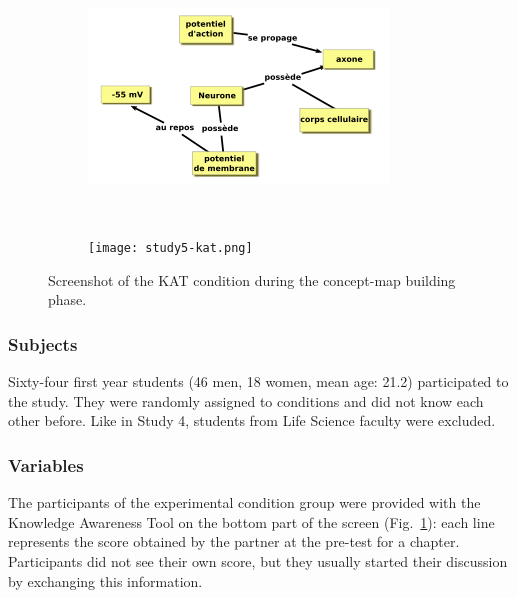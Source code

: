\documentclass[natbib]{svjour3}
\begin{document}
\begin{figure}[h!t]
        \centering
        \begin{subfigure}{.6\textwidth}
            \includegraphics[width=\linewidth]{study5-conceptmap.png}
        \end{subfigure} \\
        \begin{subfigure}{.7\textwidth}
            \texttt{[image: study5-kat.png]}
        \end{subfigure}
        \caption{Screenshot of the KAT condition during the concept-map building
        phase.}
        \label{study5:kat}
\end{figure}

\subsubsection*{Subjects}
Sixty-four first year students (46 men, 18 women, mean age: 21.2)
participated to the study. They were randomly assigned to conditions and
did not know each other before. Like in Study 4, students from Life Science
faculty were excluded.

\subsubsection*{Variables}

The participants of the experimental condition group were provided with the
Knowledge Awareness Tool on the bottom part of the screen
(Fig.~\ref{study5:kat}): each line represents the score obtained by the partner
at the pre-test for a chapter. Participants did not see their own score, but they
usually started their discussion by exchanging this information.
\end{document}
